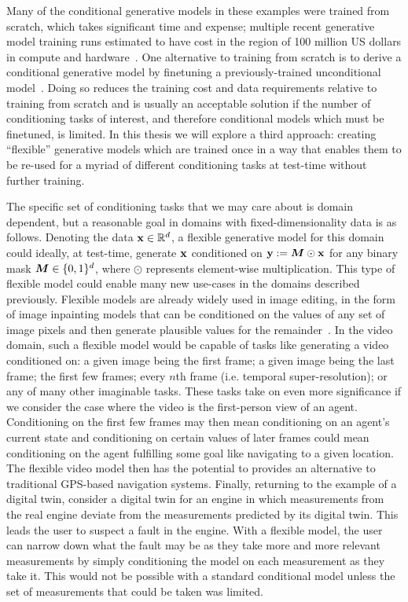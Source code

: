 Many of the conditional generative models in these examples were trained from scratch, which takes significant time and expense; multiple recent generative model training runs estimated to have cost in the region of 100 million US dollars in compute and hardware~\citep{knight2023openai,stanford2024artificial}. One alternative to training from scratch is to derive a conditional generative model by finetuning a previously-trained unconditional model~\citep{tian2023control,sheynin2023emu}. Doing so reduces the training cost and data requirements relative to training from scratch and is usually an acceptable solution if the number of conditioning tasks of interest, and therefore conditional models which must be finetuned, is limited. In this thesis we will explore a third approach: creating ``flexible'' generative models which are trained once in a way that enables them to be re-used for a myriad of different conditioning tasks at test-time without further training.

The specific set of conditioning tasks that we may care about is domain dependent, but a reasonable goal in domains with fixed-dimensionality data is as follows. Denoting the data ${\mathbf{x}} \in \mathbb{R}^d$, a flexible generative model for this domain could ideally, at test-time, generate ${\mathbf{x}}$ conditioned on ${\mathbf{y}} := {\bm{M}} \odot {\mathbf{x}}$ for any binary mask ${\bm{M}} \in \{0,1\}^d$, where $\odot$ represents element-wise multiplication. This type of flexible model could enable many new use-cases in the domains described previously. Flexible models are already widely used in image editing, in the form of image inpainting models that can be conditioned on the values of any set of image pixels and then generate plausible values for the remainder~\citep{rombach2022high,zhao2021large,harvey2021conditional}. In the video domain, such a flexible model would be capable of tasks like generating a video conditioned on: a given image being the first frame; a given image being the last frame; the first few frames; every $n$th frame (i.e. temporal super-resolution); or any of many other imaginable tasks. These tasks take on even more significance if we consider the case where the video is the first-person view of an agent. Conditioning on the first few frames may then mean conditioning on an agent's current state and conditioning on certain values of later frames could mean conditioning on the agent fulfilling some goal like navigating to a given location. The flexible video model then has the potential to provides an alternative to traditional GPS-based navigation systems. Finally, returning to the example of a digital twin, consider a digital twin for an engine in which measurements from the real engine deviate from the measurements predicted by its digital twin. This leads the user to suspect a fault in the engine. With a flexible model, the user can narrow down what the fault may be as they take more and more relevant measurements by simply conditioning the model on each measurement as they take it. This would not be possible with a standard conditional model unless the set of measurements that could be taken was limited.

